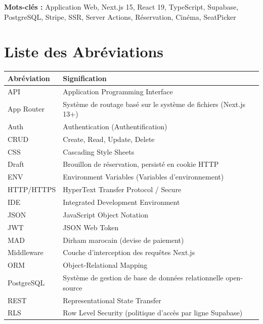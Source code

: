\documentclass[12pt,a4paper,openany]{report}
\begin{document}
\bigskip
\noindent\textbf{Mots-clés :} Application Web, Next.js 15, React 19, TypeScript, Supabase, PostgreSQL, Stripe, SSR, Server Actions, Réservation, Cinéma, SeatPicker

\newpage
\tableofcontents
\newpage
\listoffigures
\newpage
\listoftables

\newpage
\chapter*{Liste des Abréviations}

\begin{longtable}{lp{10cm}}
  \toprule
  \textbf{Abréviation} & \textbf{Signification} \\
  \midrule
  \endhead
  \bottomrule
  \endfoot
  API            & Application Programming Interface \\
  App Router     & Système de routage basé sur le système de fichiers (Next.js 13+) \\
  Auth           & Authentication (Authentification) \\
  CRUD           & Create, Read, Update, Delete \\
  CSS            & Cascading Style Sheets \\
  Draft          & Brouillon de réservation, persisté en cookie HTTP \\
  ENV            & Environment Variables (Variables d'environnement) \\
  HTTP/HTTPS     & HyperText Transfer Protocol / Secure \\
  IDE            & Integrated Development Environment \\
  JSON           & JavaScript Object Notation \\
  JWT            & JSON Web Token \\
  MAD            & Dirham marocain (devise de paiement) \\
  Middleware     & Couche d'interception des requêtes Next.js \\
  ORM            & Object-Relational Mapping \\
  PostgreSQL     & Système de gestion de base de données relationnelle open-source \\
  REST           & Representational State Transfer \\
  RLS            & Row Level Security (politique d'accès par ligne Supabase) \\

\end{longtable}
\end{document}
